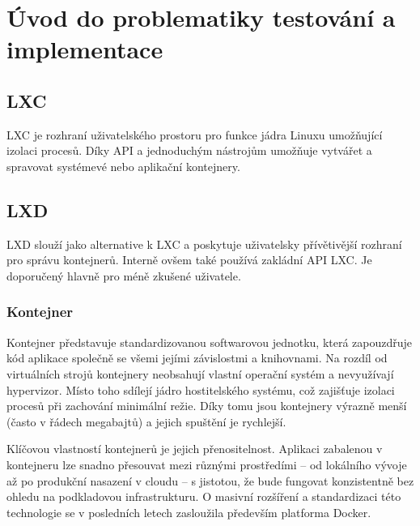 \section{Úvod do problematiky testování a implementace}
\subsection{LXC}
LXC je rozhraní uživatelského prostoru pro funkce jádra Linuxu umožňující izolaci procesů.
Díky API a jednoduchým nástrojům umožňuje vytvářet a spravovat systémevé nebo aplikační kontejnery. \cite{lxcintro}

\subsection{LXD}
LXD slouží jako alternative k LXC a poskytuje uživatelsky přívětivější rozhraní pro správu kontejnerů.
Interně ovšem také používá zakládní API LXC. Je doporučený hlavně pro méně zkušené uživatele. 

\subsubsection{Kontejner}
Kontejner představuje standardizovanou softwarovou jednotku, která zapouzdřuje kód aplikace společně se všemi jejími závislostmi a knihovnami. 
Na rozdíl od virtuálních strojů kontejnery neobsahují vlastní operační systém a nevyužívají hypervizor. 
Místo toho sdílejí jádro hostitelského systému, což zajišťuje izolaci procesů při zachování minimální režie. 
Díky tomu jsou kontejnery výrazně menší (často v řádech megabajtů) a jejich spuštění je rychlejší. \cite{redhatcontainers}

Klíčovou vlastností kontejnerů je jejich přenositelnost. Aplikaci zabalenou v kontejneru lze snadno přesouvat mezi různými 
prostředími – od lokálního vývoje až po produkční nasazení v cloudu – s jistotou, že bude fungovat konzistentně bez ohledu na podkladovou 
infrastrukturu. O masivní rozšíření a standardizaci této technologie se v posledních letech zasloužila především platforma Docker.

